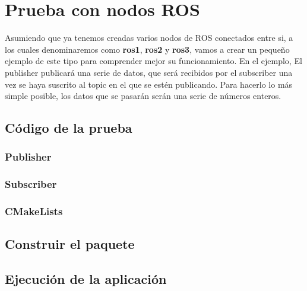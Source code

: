 \chapter{Prueba con nodos ROS}
Asumiendo que ya tenemos creadas varios nodos de ROS conectados entre si, a los cuales denominaremos como \textbf{ros1}, \textbf{ros2} y \textbf{ros3}, vamos a crear un pequeño ejemplo de este tipo para comprender mejor su funcionamiento. En el ejemplo, El publisher publicará una serie de datos, que será recibidos por el subscriber una vez se haya suscrito al topic en el que se estén publicando. Para hacerlo lo más simple posible, los datos que se pasarán serán una serie de números enteros.

	\section{Código de la prueba}
	
	\subsection{Publisher}
	
	
	\subsection{Subscriber}
	
	
	\subsection{CMakeLists}
	
	
	\section{Construir el paquete}
	
	\section{Ejecución de la aplicación}
